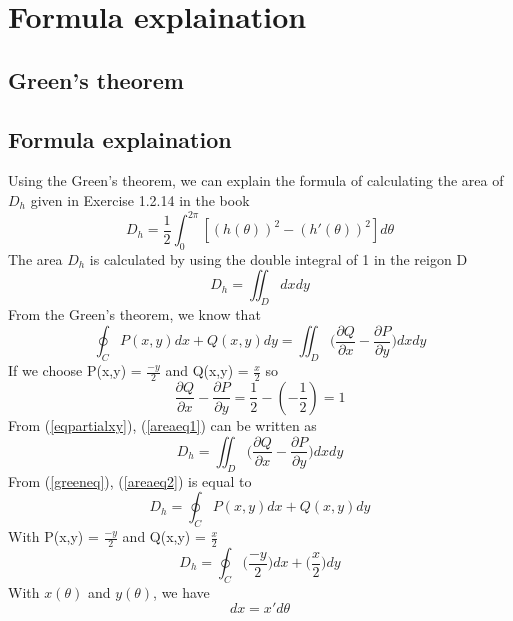 \documentclass[a4paper]{article}
\begin{document}
\section{Formula explaination}
\subsection{Green's theorem}

\subsection{Formula explaination}
Using the Green's theorem, we can explain the formula of calculating the area of $D_h$ given in Exercise 1.2.14 in the book 
\begin{equation*}
    D_h = \frac{1}{2}\int^{2\pi}_0\left[(h(\theta))^2 - (h'(\theta))^2\right]d\theta 
\end{equation*}
The area $D_h$ is calculated by using the double integral of 1 in the reigon D
\begin{equation}\label{areaeq1}
    D_h = \iint_{D}dxdy
\end{equation}
From the Green's theorem, we know that
\begin{equation}\label{greeneq}
    \oint_C P(x,y)dx + Q(x,y)dy = \iint_{D} \bigg(\frac{\partial Q}{\partial x} - \frac{\partial P}{\partial y}\bigg)dxdy
\end{equation}
If we choose P(x,y) = $\frac{-y}{2}$ and Q(x,y) = $\frac{x}{2}$ so
\begin{equation}\label{eqpartialxy}
    \frac{\partial Q}{\partial x} - \frac{\partial P}{\partial y}= \frac{1}{2} - (-\frac{1}{2}) = 1
\end{equation}
From (\ref{eqpartialxy}), (\ref{areaeq1}) can be written as
\begin{equation}\label{areaeq2}
    D_h = \iint_D \bigg(\frac{\partial Q}{\partial x} - \frac{\partial P}{\partial y}\bigg)dxdy
\end{equation}
From (\ref{greeneq}), (\ref{areaeq2}) is equal to
\begin{equation}
    D_h = \oint_C P(x,y)dx + Q(x,y)dy
\end{equation}
With P(x,y) = $\frac{-y}{2}$ and Q(x,y) = $\frac{x}{2}$
\begin{equation}\label{areaeq3}
    D_h = \oint_C \bigg(\frac{-y}{2}\bigg)dx + \bigg(\frac{x}{2}\bigg)dy
\end{equation}
With $x(\theta)$ and $y(\theta)$, we have
\begin{equation*}
    dx = x'd\theta
\end{equation*}
\end{document}
